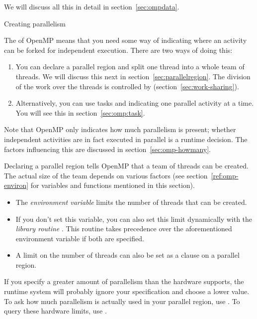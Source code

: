 We will discuss all this in detail in section~\ref{sec:ompdata}.

 {Creating parallelism}

The  of OpenMP means that you need some way of
indicating where an activity can be forked for independent execution.
There are two ways of doing this:
\begin{enumerate}
\item You can declare a parallel region and
  split one thread into a whole team of threads. We will discuss this next
  in section~\ref{sec:parallelregion}. The division of the work over the threads
  is controlled by  (section~\ref{sec:work-sharing}).
\item Alternatively, you can use tasks and indicating one parallel
  activity at a time. You will see this in section~\ref{sec:omp:task}.
\end{enumerate}

Note that OpenMP only indicates how much parallelism is present;
whether independent activities are in fact executed in parallel
is a runtime decision. The factors influencing this are discussed
in section~\ref{sec:omp-howmany}.

Declaring a parallel region tells OpenMP that a team of threads can be created.
The actual size of the team depends on various factors (see section~\ref{ref:omp-environ}
for variables and functions mentioned in this section).
\begin{itemize}
\item The \emph{environment variable}
   limits the number of
  threads that can be created.
\item If you don't set this variable, you can also set this limit
  dynamically with the \emph{library routine} . This routine takes
  precedence over the aforementioned environment variable if both are
  specified.
\item A limit on the number of threads can also be set as a clause
  on a parallel region.
\end{itemize}
If you specify a greater amount of parallelism than the hardware supports,
the runtime system will probably ignore your specification and choose a lower value.
To ask how much parallelism is actually used in your parallel region,
use . To query these hardware limits,
use .


